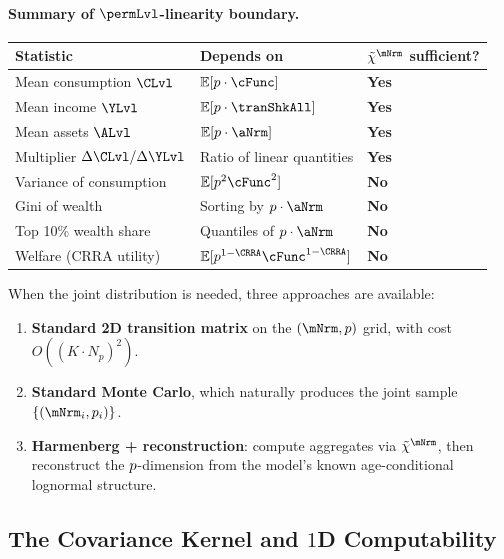 \documentclass[\econtexRoot/BufferStockTheory]{subfiles}
\begin{document}
\paragraph{Summary of $\permLvl$-linearity boundary.}
\begin{center}
\begin{tabular}{lll}
\hline
Statistic & Depends on & $\mpPrbMargWgt$ sufficient? \\
\hline
Mean consumption $\CLvl$ & $\mathbb{E}[\permLvlPrb \cdot \cFunc]$ & \textbf{Yes} \\
Mean income $\YLvl$ & $\mathbb{E}[\permLvlPrb \cdot \tranShkAll]$ & \textbf{Yes} \\
Mean assets $\ALvl$ & $\mathbb{E}[\permLvlPrb \cdot \aNrm]$ & \textbf{Yes} \\
Multiplier $\Delta\CLvl/\Delta\YLvl$ & Ratio of linear quantities & \textbf{Yes} \\
Variance of consumption & $\mathbb{E}[\permLvlPrb^{2} \cFunc^{2}]$ & \textbf{No} \\
Gini of wealth & Sorting by $\permLvlPrb \cdot \aNrm$ & \textbf{No} \\
Top 10\% wealth share & Quantiles of $\permLvlPrb \cdot \aNrm$ & \textbf{No} \\
Welfare (CRRA utility) & $\mathbb{E}[\permLvlPrb^{1-\CRRA}\cFunc^{1-\CRRA}]$ & \textbf{No} \\
\hline
\end{tabular}
\end{center}

When the joint distribution is needed, three approaches are available:
\begin{enumerate}
\item \textbf{Standard 2D transition matrix} on the $({\mNrm}, \permLvlPrb)$ grid, with cost $O((K \cdot N_{p})^{2})$.
\item \textbf{Standard Monte Carlo}, which naturally produces the joint sample $\{(\mNrm_i, \permLvlPrb_i)\}$.
\item \textbf{Harmenberg + reconstruction}: compute aggregates via $\mpPrbMargWgt$, then reconstruct the $p$-dimension from the model's known age-conditional lognormal structure.
\end{enumerate}


\subsection{The Covariance Kernel and $1$D Computability}\label{sec:CovKernel}
\end{document}
